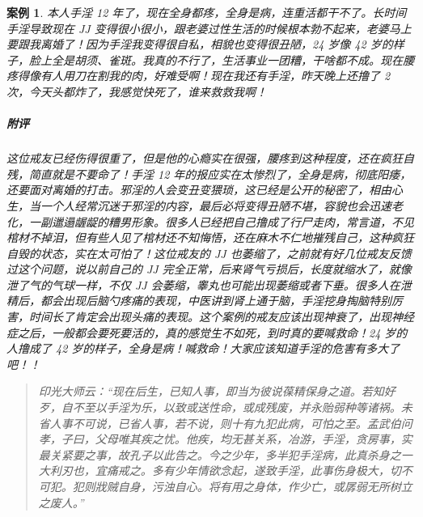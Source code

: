 \documentclass{ctexart}
\newtheorem{case}{案例}
\begin{document}
\begin{case}
    本人手淫 12 年了，现在全身都疼，全身是病，连重活都干不了。长时间手淫导致现在 JJ 变得很小很小，跟老婆过性生活的时候根本勃不起来，老婆马上要跟我离婚了！因为手淫我变得很自私，相貌也变得很丑陋，24 岁像 42 岁的样子，脸上全是胡须、雀斑。我真的不行了，生活事业一团糟，干啥都不成。现在腰疼得像有人用刀在割我的肉，好难受啊！现在我还有手淫，昨天晚上还撸了 2 次，今天头都炸了，我感觉快死了，谁来救救我啊！

    \subparagraph{附评} 这位戒友已经伤得很重了，但是他的心瘾实在很强，腰疼到这种程度，还在疯狂自残，简直就是不要命了！手淫 12 年的报应实在太惨烈了，全身是病，彻底阳痿，还要面对离婚的打击。邪淫的人会变丑变猥琐，这已经是公开的秘密了，相由心生，当一个人经常沉迷于邪淫的内容，最后必将变得丑陋不堪，容貌也会迅速老化，一副邋遢龌龊的糟男形象。很多人已经把自己撸成了行尸走肉，常言道，不见棺材不掉泪，但有些人见了棺材还不知悔悟，还在麻木不仁地摧残自己，这种疯狂自毁的状态，实在太可怕了！这位戒友的 JJ 也萎缩了，之前就有好几位戒友反馈过这个问题，说以前自己的 JJ 完全正常，后来肾气亏损后，长度就缩水了，就像泄了气的气球一样，不仅 JJ 会萎缩，睾丸也可能出现萎缩或者下垂。很多人在泄精后，都会出现后脑勺疼痛的表现，中医讲到肾上通于脑，手淫挖身掏脑特别厉害，时间长了肯定会出现头痛的表现。这个案例的戒友应该出现神衰了，出现神经症之后，一般都会要死要活的，真的感觉生不如死，到时真的要喊救命！24 岁的人撸成了 42 岁的样子，全身是病！喊救命！大家应该知道手淫的危害有多大了吧！！
\end{case}

\begin{quotation}\it
    印光大师云：“现在后生，已知人事，即当为彼说葆精保身之道。若知好歹，自不至以手淫为乐，以致或送性命，或成残废，并永贻弱种等诸祸。未省人事不可说，已省人事，若不说，则十有九犯此病，可怕之至。孟武伯问孝，子曰，父母唯其疾之忧。他疾，均无甚关系，冶游，手淫，贪房事，实最关紧要之事，故孔子以此告之。今之少年，多半犯手淫病，此真杀身之一大利刃也，宜痛戒之。多有少年情欲念起，遂致手淫，此事伤身极大，切不可犯。犯则戕贼自身，污浊自心。将有用之身体，作少亡，或孱弱无所树立之废人。”
\end{quotation}
\end{document}

